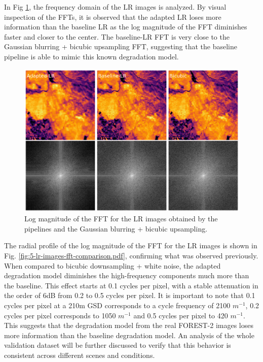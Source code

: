         In Fig \ref{fig:5-lr-images-fft.pdf}, the frequency domain of the LR images is analyzed.
        By visual inspection of the FFTs, it is observed that the adapted LR loses more information than the baseline LR as the log magnitude of the FFT diminishes faster and closer to the center.
        The baseline-LR FFT is very close to the Gaussian blurring + bicubic upsampling FFT, suggesting that the baseline pipeline is able to mimic this known degradation model.

        \begin{figure}[H]
            \centering
            \includegraphics[scale=0.3]{Includes/5-lr-images-fft.pdf}
            \caption{Log magnitude of the FFT for the LR images obtained by the pipelines and the Gaussian blurring + bicubic upsampling.}
            \label{fig:5-lr-images-fft.pdf}
        \end{figure}

        The radial profile of the log magnitude of the FFT for the LR images is shown in Fig. \ref{fig:5-lr-images-fft-comparison.pdf}, confirming what was observed previously. When compared to bicubic downsampling + white noise,
        the adapted degradation model diminishes the high-frequency components much more than the baseline. This effect starts at 0.1 cycles per pixel, with a stable attenuation in the order of 6dB from 0.2 to 0.5 cycles per pixel. 
        It is important to note that 0.1 cycles per pixel at a 210m GSD corresponds to a cycle frequency of 2100 $m^{-1}$, 0.2 cycles per pixel corresponds to 1050 $m^{-1}$ and 0.5 cycles per pixel to 420 $m^{-1}$.
        This suggests that the degradation model from the real FOREST-2 images loses more information than the baseline degradation model.
        An analysis of the whole validation dataset will be further discussed to verify that this behavior is consistent across different scenes and conditions.


